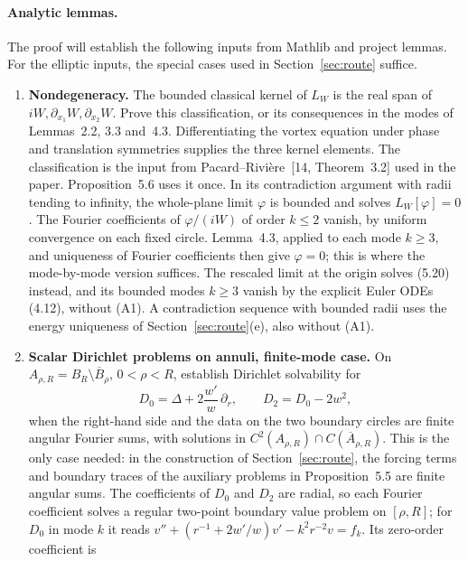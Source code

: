 \documentclass[11pt]{amsart}
\theoremstyle{definition}
\begin{document}
\paragraph{Analytic lemmas.}
The proof will establish the following inputs from Mathlib and project lemmas.
For the elliptic inputs, the special cases used in Section~\ref{sec:route} suffice.
\begin{enumerate}[label=(A\arabic*)]
  \item \textbf{Nondegeneracy.} The bounded classical kernel of $L_W$ is the
        real span of $iW,\partial_{x_1}W,\partial_{x_2}W$. Prove this
        classification, or its consequences in the modes of Lemmas~2.2, 3.3
        and~4.3. Differentiating the vortex equation under phase and translation
        symmetries supplies the three kernel elements. The classification is
        the input from Pacard--Rivi\`ere~[14, Theorem~3.2] used in the paper.
        Proposition~5.6 uses it once. In its contradiction argument with radii
        tending to infinity, the whole-plane limit $\varphi$ is bounded and solves
        $L_W[\varphi]=0$. The Fourier coefficients of $\varphi/(iW)$ of order
        $k\le2$ vanish, by uniform convergence on each fixed circle. Lemma~4.3,
        applied to each mode $k\ge3$, and uniqueness of Fourier coefficients then
        give $\varphi=0$; this is where the mode-by-mode version suffices. The
        rescaled limit at the origin solves (5.20) instead, and its bounded modes
        $k\ge3$ vanish by the explicit Euler ODEs (4.12), without (A1). A
        contradiction sequence with bounded radii uses the energy uniqueness of
        Section~\ref{sec:route}(e), also without (A1).
  \item \textbf{Scalar Dirichlet problems on annuli, finite-mode case.} On
        $A_{\rho,R}=B_R\setminus\overline{B}_\rho$, $0<\rho<R$, establish Dirichlet
        solvability for
        \[
          D_0=\Delta+2\frac{w'}w\,\partial_r,\qquad D_2=D_0-2w^2,
        \]
        when the right-hand side and the data on the two boundary circles are
        finite angular Fourier sums, with solutions in
        $C^2(A_{\rho,R})\cap C(\overline A_{\rho,R})$. This is the only case
        needed: in the construction of Section~\ref{sec:route}, the forcing terms
        and boundary traces of the auxiliary problems in Proposition~5.5 are finite
        angular sums. The coefficients of $D_0$ and $D_2$ are radial, so each
        Fourier coefficient solves a regular two-point boundary value problem on
        $[\rho,R]$; for $D_0$ in mode $k$ it reads
        $v''+(r^{-1}+2w'/w)v'-k^2r^{-2}v=f_k$. Its zero-order coefficient is

\end{enumerate}
\end{document}
